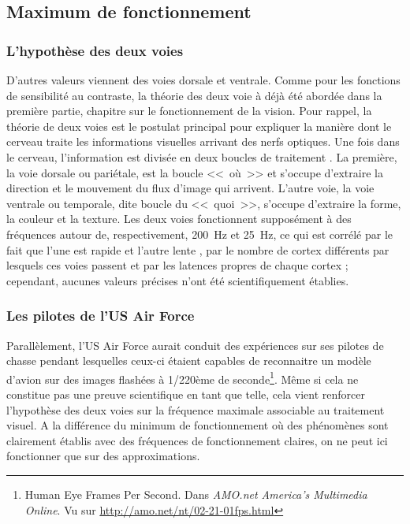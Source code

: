 	
	\subsection{Maximum de fonctionnement}
	
	\subsubsection{L'hypothèse des deux voies}
	\par D'autres valeurs viennent des voies dorsale et ventrale. Comme pour les fonctions de sensibilité au contraste, la théorie des deux voie à déjà été abordée dans la première partie, chapitre sur le fonctionnement de la vision. Pour rappel, la théorie de deux voies est le postulat principal pour expliquer la manière dont le cerveau traite les informations visuelles arrivant des nerfs optiques. Une fois dans le cerveau, l'information est divisée en deux boucles de traitement \citep{ingle_two_1982,dhondt_emotion_2011}. La première, la voie dorsale ou pariétale, est la boucle <<~où~>> et s'occupe d'extraire la direction et le mouvement du flux d'image qui arrivent. L'autre voie, la voie ventrale ou temporale, dite boucle du <<~quoi~>>, s'occupe d'extraire la forme, la couleur et la texture. Les deux voies fonctionnent supposément à des fréquences autour de, respectivement, 200~Hz et 25~Hz, ce qui est corrélé par le fait que l'une est rapide et l'autre lente \citep{dhondt_emotion_2011}, par le nombre de cortex différents par lesquels ces voies passent \citep{dhondt_emotion_2011} et par les latences propres de chaque cortex \citep{bullier_integrated_2001} ; cependant, aucunes valeurs précises n'ont été scientifiquement établies.
	
	\subsubsection{Les pilotes de l'US Air Force}	
	Parallèlement, l'US Air Force aurait conduit des expériences sur ses pilotes de chasse pendant lesquelles ceux-ci étaient capables de reconnaitre un modèle d'avion sur des images flashées à 1/220ème de seconde\footnote{Human Eye Frames Per Second. Dans \textit{AMO.net America's Multimedia Online}. Vu sur \url{http://amo.net/nt/02-21-01fps.html}}. Même si cela ne constitue pas une preuve scientifique en tant que telle, cela vient renforcer l'hypothèse des deux voies sur la fréquence maximale associable au traitement visuel. A la différence du minimum de fonctionnement où des phénomènes sont clairement établis avec des fréquences de fonctionnement claires, on ne peut ici fonctionner que sur des approximations.
		
